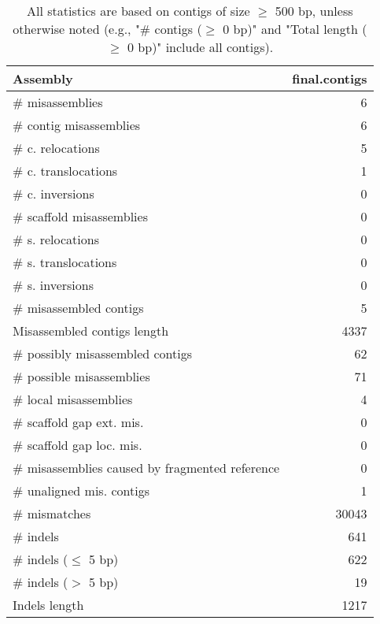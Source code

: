 \documentclass[12pt,a4paper]{article}
\begin{document}
\begin{table}[ht]
\begin{center}
\caption{All statistics are based on contigs of size $\geq$ 500 bp, unless otherwise noted (e.g., "\# contigs ($\geq$ 0 bp)" and "Total length ($\geq$ 0 bp)" include all contigs).}
\begin{tabular}{|l*{1}{|r}|}
\hline
Assembly & final.contigs \\ \hline
\# misassemblies & 6 \\ \hline
\hspace{2mm}\# contig misassemblies & 6 \\ \hline
\hspace{5mm}\# c. relocations & 5 \\ \hline
\hspace{5mm}\# c. translocations & 1 \\ \hline
\hspace{5mm}\# c. inversions & 0 \\ \hline
\hspace{2mm}\# scaffold misassemblies & 0 \\ \hline
\hspace{5mm}\# s. relocations & 0 \\ \hline
\hspace{5mm}\# s. translocations & 0 \\ \hline
\hspace{5mm}\# s. inversions & 0 \\ \hline
\# misassembled contigs & 5 \\ \hline
Misassembled contigs length & 4337 \\ \hline
\# possibly misassembled contigs & 62 \\ \hline
\hspace{5mm}\# possible misassemblies & 71 \\ \hline
\# local misassemblies & 4 \\ \hline
\# scaffold gap ext. mis. & 0 \\ \hline
\# scaffold gap loc. mis. & 0 \\ \hline
\# misassemblies caused by fragmented reference & 0 \\ \hline
\# unaligned mis. contigs & 1 \\ \hline
\# mismatches & 30043 \\ \hline
\# indels & 641 \\ \hline
\hspace{5mm}\# indels ($\leq$ 5 bp) & 622 \\ \hline
\hspace{5mm}\# indels ($>$ 5 bp) & 19 \\ \hline
Indels length & 1217 \\ \hline
\end{tabular}
\end{center}
\end{table}
\end{document}
